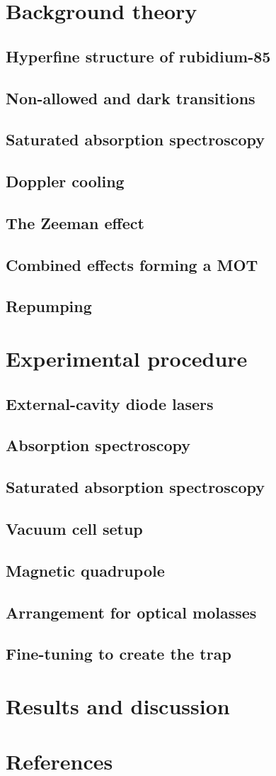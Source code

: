\documentclass[11pt,twoside,a4paper]{article}
\begin{document}
\section{Background theory}
\subsection{Hyperfine structure of rubidium-85}
\subsection{Non-allowed and dark transitions}
\subsection{Saturated absorption spectroscopy}
\subsection{Doppler cooling}
\subsection{The Zeeman effect}
\subsection{Combined effects forming a MOT}
\subsection{Repumping}
\section{Experimental procedure}
\subsection{External-cavity diode lasers}
\subsection{Absorption spectroscopy}
\subsection{Saturated absorption spectroscopy}
\subsection{Vacuum cell setup}
\subsection{Magnetic quadrupole}
\subsection{Arrangement for optical molasses}
\subsection{Fine-tuning to create the trap}
\section{Results and discussion}
\vfill
\pagebreak
\section{References}


\end{document}
